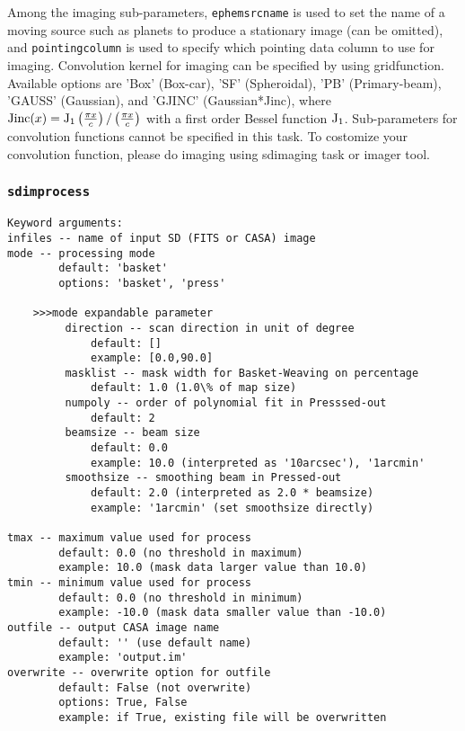 Among the imaging sub-parameters, {\tt ephemsrcname} is used to set the name of 
a moving source such as planets to produce a stationary image (can be omitted), and
{\tt pointingcolumn} is
used to specify which pointing data column to use for imaging.
Convolution kernel for imaging can be 
specified by using gridfunction. Available options are 'Box' (Box-car),
'SF' (Spheroidal), 'PB' (Primary-beam), 'GAUSS' (Gaussian), and 
'GJINC' (Gaussian*Jinc), where 
${\rm Jinc}(x) = {\rm J}_1 \left( \frac{\pi x}{c} \right) / \left(\frac{\pi x}{c} \right) $
with a 
first order Bessel function ${\rm J}_1$. Sub-parameters for convolution 
functions cannot be specified in this task. To costomize your 
convolution function, please do imaging using sdimaging task or 
imager tool.

\subsubsection{{\tt sdimprocess}}
\label{section:sd.sdtasks.tasks.sdimprocess}

\begin{verbatim}
Keyword arguments:
infiles -- name of input SD (FITS or CASA) image
mode -- processing mode
        default: 'basket'
        options: 'basket', 'press'

    >>>mode expandable parameter
         direction -- scan direction in unit of degree
             default: []
             example: [0.0,90.0]
         masklist -- mask width for Basket-Weaving on percentage
             default: 1.0 (1.0\% of map size)
         numpoly -- order of polynomial fit in Presssed-out
             default: 2
         beamsize -- beam size 
             default: 0.0
             example: 10.0 (interpreted as '10arcsec'), '1arcmin'
         smoothsize -- smoothing beam in Pressed-out
             default: 2.0 (interpreted as 2.0 * beamsize)
             example: '1arcmin' (set smoothsize directly)

tmax -- maximum value used for process
        default: 0.0 (no threshold in maximum)
        example: 10.0 (mask data larger value than 10.0)
tmin -- minimum value used for process
        default: 0.0 (no threshold in minimum)
        example: -10.0 (mask data smaller value than -10.0)
outfile -- output CASA image name
        default: '' (use default name)
        example: 'output.im'
overwrite -- overwrite option for outfile
        default: False (not overwrite)
        options: True, False
        example: if True, existing file will be overwritten
\end{verbatim}

